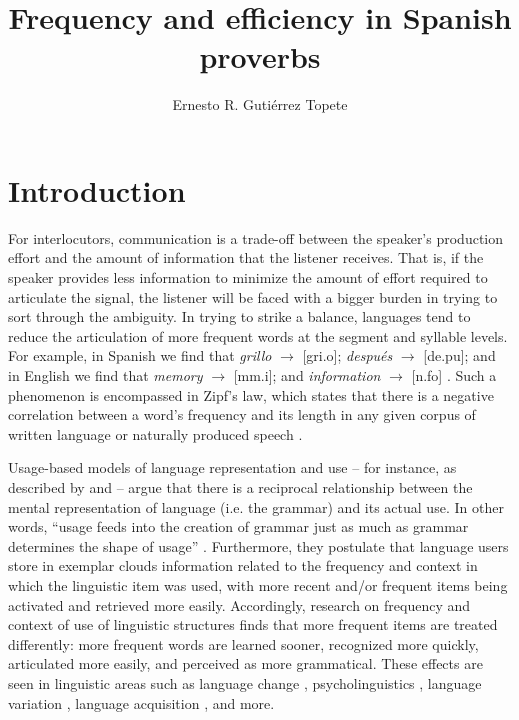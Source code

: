 \documentclass[output=paper,colorlinks,citecolor=brown,draftmode]{langscibook}
\author{Ernesto R. Gutiérrez Topete\affiliation{University of California, Berkeley}}
\title{Frequency and efficiency in Spanish proverbs}
\begin{document}
\maketitle

\section{Introduction}

For interlocutors, communication is a trade-off between the speaker's production effort and the amount of information that the listener receives. That is, if the speaker provides less information to minimize the amount of effort required to articulate the signal, the listener will be faced with a bigger burden in trying to sort through the ambiguity. In trying to strike a balance, languages tend to reduce the articulation of more frequent words at the segment and syllable levels. For example, in Spanish we find that \emph{grillo} $\rightarrow$ [\textprimstress gri.o]; \emph{después} $\rightarrow$ [de.\textprimstress pu]; and in English we find that \emph{memory} $\rightarrow$ [\textprimstress m\textepsilon m.\textturnr i]; and \emph{information} $\rightarrow$ [\textprimstress \textsci n.fo\textupsilon] \citep{lipski1990elision,brown2008usage,bybee2002phonological,mahowald2013info}. Such a phenomenon is encompassed in Zipf's law, which states that there is a negative correlation between a word's frequency and its length in any given corpus of written language or naturally produced speech \citep{zipf1936psychobiology,zipf1949human}.

Usage-based models of language representation and use -- for instance, as described by \citet{bybee2001phonology} and \citet{pierrehumbert2001exemplar} -- argue that there is a reciprocal relationship between the mental representation of language (i.e. the grammar) and its actual use. In other words, ``usage feeds into the creation of grammar just as much as grammar determines the shape of usage'' \citep[730]{bybee2006usage}. Furthermore, they postulate that language users store in exemplar clouds information related to the frequency and context in which the linguistic item was used, with more recent and/or frequent items being activated and retrieved more easily. Accordingly, research on frequency and context of use of linguistic structures finds that more frequent items are treated differently: more frequent words are learned sooner, recognized more quickly, articulated more easily, and perceived as more grammatical. These effects are seen in linguistic areas such as language change \citep{phillips1984word,phillips1999mental,bybee2000phonology,bybee2001phonology,bybee2002word}, psycholinguistics \citep{vitevitch1998words,vitevitch2002naturalistic}, language variation \citep{ellis2002frequency,ellis2002reflections}, language acquisition \citep{bybee2002cognitive,erker2011acoustic,file2010gradient}, and more.
\end{document}
